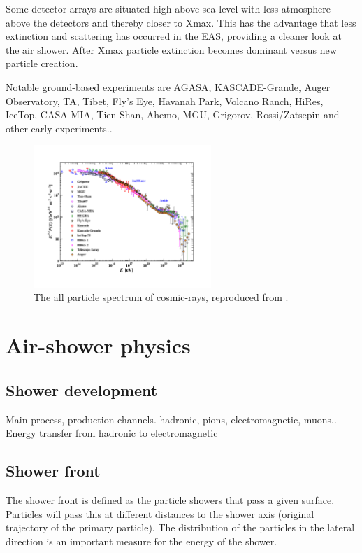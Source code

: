 Some detector arrays are situated high above sea-level with less atmosphere above the detectors and thereby closer to Xmax. This has the advantage that less extinction and scattering has occurred in the EAS, providing a cleaner look at the air shower. After Xmax particle extinction becomes dominant versus new particle creation.

Notable ground-based experiments are AGASA, KASCADE-Grande, Auger Observatory, TA, Tibet, Fly's Eye, Havanah Park, Volcano Ranch, HiRes, IceTop, CASA-MIA, Tien-Shan, Ahemo, MGU, Grigorov, Rossi/Zatsepin and other early experiments..

\begin{figure}
    \centering
    \includegraphics[width=0.6\textwidth]
                    {plots/cosmic-rays/PDG_28_8_all_particle_spectrum}
    \caption{The all particle spectrum of cosmic-rays, reproduced from \cite{olive2014pdg}.}
    \label{fig:spectrum}
\end{figure}


\section{Air-shower physics}

\subsection{Shower development}

Main process, production channels. hadronic, pions, electromagnetic, muons..
Energy transfer from hadronic to electromagnetic


\subsection{Shower front}

The shower front is defined as the particle showers that pass a given surface. Particles will pass this at different distances to the shower axis (original trajectory of the primary particle). The distribution of the particles in the lateral direction is an important measure for the energy of the shower.

